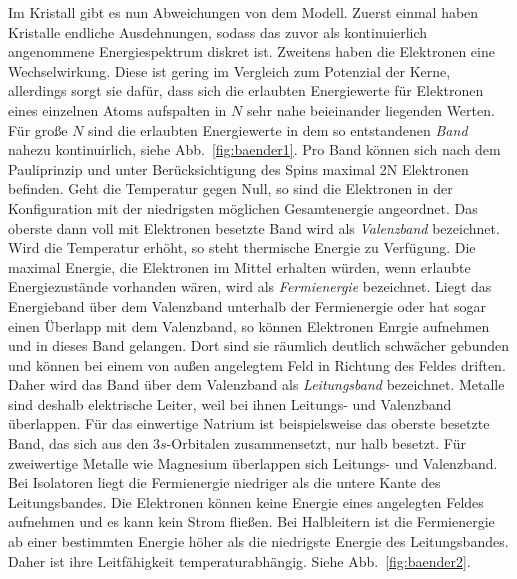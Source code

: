 Im Kristall gibt es nun Abweichungen von dem Modell. Zuerst einmal haben Kristalle 
endliche Ausdehnungen, sodass das zuvor als kontinuierlich angenommene 
Energiespektrum diskret ist. Zweitens haben die Elektronen eine Wechselwirkung. 
Diese ist gering im Vergleich zum Potenzial der Kerne, allerdings sorgt sie dafür, 
dass sich die erlaubten Energiewerte für Elektronen eines einzelnen Atoms aufspalten 
in $N$ sehr nahe beieinander liegenden Werten. Für große $N$ sind die erlaubten 
Energiewerte in dem so entstandenen \emph{Band} nahezu kontinuirlich, 
siehe Abb.~\ref{fig:baender1}. Pro Band können  
sich nach dem Pauliprinzip und unter Berücksichtigung des Spins maximal 2N Elektronen 
befinden. Geht die Temperatur gegen Null, so sind die Elektronen in der Konfiguration 
mit der niedrigsten möglichen Gesamtenergie angeordnet. Das oberste dann voll mit 
Elektronen besetzte Band wird als \emph{Valenzband} bezeichnet. Wird die Temperatur 
erhöht, so steht thermische Energie zu Verfügung. Die maximal Energie, die Elektronen 
im Mittel erhalten würden, wenn erlaubte Energiezustände vorhanden wären, wird als 
\emph{Fermienergie} bezeichnet. 
Liegt das Energieband über dem Valenzband unterhalb der Fermienergie oder hat sogar 
einen Überlapp mit dem Valenzband, so können Elektronen Enrgie aufnehmen und in dieses 
Band gelangen. Dort sind sie räumlich deutlich schwächer gebunden und können bei einem 
von außen angelegtem Feld in Richtung des Feldes driften. Daher wird das Band über dem 
Valenzband als \emph{Leitungsband} bezeichnet. Metalle sind deshalb elektrische Leiter, weil 
bei ihnen Leitungs- und Valenzband überlappen. Für das einwertige Natrium ist beispielsweise 
das oberste besetzte Band, das sich aus den 3$s$-Orbitalen zusammensetzt, nur halb besetzt. 
Für zweiwertige Metalle wie Magnesium überlappen sich Leitungs- und Valenzband. 
Bei Isolatoren liegt die Fermienergie niedriger als die untere Kante des Leitungsbandes. 
Die Elektronen können keine Energie eines angelegten Feldes aufnehmen und es kann kein 
Strom fließen. Bei Halbleitern ist die Fermienergie ab einer bestimmten Energie höher 
als die niedrigste Energie des Leitungsbandes. Daher ist ihre Leitfähigkeit 
temperaturabhängig. Siehe Abb.~\ref{fig:baender2}.\cite{demtroder2000experimentalphysik}\\ 

\newcommand{\picwidththeo}{0.48\textwidth}

